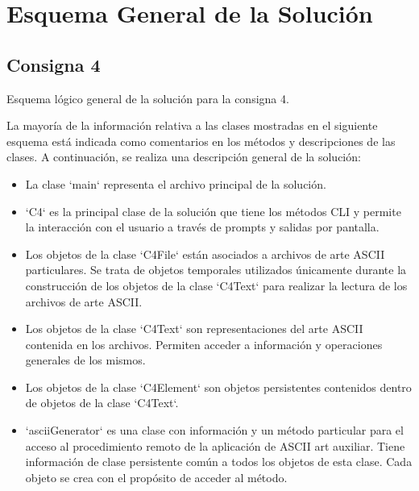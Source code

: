 \documentclass[a4paper,12pt]{article}
\begin{document}
\section{Esquema General de la Solución}
\subsection{Consigna 4}
Esquema lógico general de la solución para la consigna 4.

La mayoría de la información relativa a las clases mostradas en el siguiente esquema está indicada como comentarios en los métodos y descripciones de las clases. A continuación, se realiza una descripción general de la solución:

\begin{itemize}
    \item La clase `main` representa el archivo principal de la solución.
    \item `C4` es la principal clase de la solución que tiene los métodos CLI y permite la interacción con el usuario a través de prompts y salidas por pantalla.
    \item Los objetos de la clase `C4File` están asociados a archivos de arte ASCII particulares. Se trata de objetos temporales utilizados únicamente durante la construcción de los objetos de la clase `C4Text` para realizar la lectura de los archivos de arte ASCII.
    \item Los objetos de la clase `C4Text` son representaciones del arte ASCII contenida en los archivos. Permiten acceder a información y operaciones generales de los mismos.
    \item Los objetos de la clase `C4Element` son objetos persistentes contenidos dentro de objetos de la clase `C4Text`.
    \item `asciiGenerator` es una clase con información y un método particular para el acceso al procedimiento remoto de la aplicación de ASCII art auxiliar. Tiene información de clase persistente común a todos los objetos de esta clase. Cada objeto se crea con el propósito de acceder al método.
\end{itemize}
\end{document}
